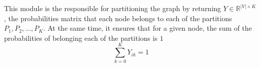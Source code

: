 This module is the responsible for partitioning the graph by returning $Y\in \mathbb R^{|V|\times K}$, the probabilities matrix that each node belongs to each of the partitions $P_1, P_2, ..., P_K$. At the same time, it ensures that for a given node, the sum of the probabilities of belonging each of the partitions is $1$
\begin{displaymath}
    \sum_{k=0}^K Y_{ik} = 1
\end{displaymath}
